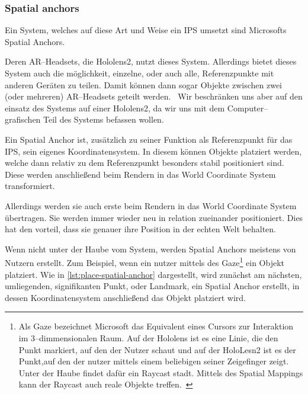     \subsubsection{Spatial anchors}\label{subsubsec:spatial-anchors}
        Ein System, welches auf diese Art und Weise ein IPS umsetzt sind Microsofts Spatial Anchors.~\autocite{thetuvix-2023B}

        Deren AR--Headsets, die Hololens2, nutzt dieses System.
        Allerdings bietet dieses System auch die möglichkeit, einzelne, oder auch alle, Referenzpunkte mit anderen Geräten zu teilen.
        Damit können dann sogar Objekte zwischen zwei (oder mehreren) AR--Headsets geteilt werden.~\autocite{pamistel-2022}
        Wir beschränken uns aber auf den einsatz des Systems auf einer Hololens2, da wir uns mit dem Computer--grafischen Teil des Systems befassen wollen.

        Ein Spatial Anchor ist, zusätzlich zu seiner Funktion als Referenzpunkt für das IPS, sein eigenes Koordinatensystem.
        In diesem können Objekte platziert werden, welche dann relativ zu dem Referenzpunkt besonders stabil positioniert sind.
        Diese werden anschließend beim Rendern in das World Coordinate System transformiert.

        Allerdings werden sie auch erste beim Rendern in das World Coordinate System übertragen.
        Sie werden immer wieder neu in relation zueinander positioniert.
        Dies hat den vorteil, dass sie genauer ihre Position in der echten Welt behalten.

        Wenn nicht unter der Haube vom System, werden Spatial Anchors meistens von Nutzern erstellt.
        Zum Beispiel, wenn ein nutzer mittels des Gaze\footnote{Als Gaze bezeichnet Microsoft das Equivalent eines Cursors zur Interaktion im 3--dimmensionalen Raum. Auf der Hololens ist es eine Linie, die den Punkt markiert, auf den der Nutzer schaut und auf der HoloLesn2 ist es der Punkt,auf den der nutzer mittels einem beliebigen seiner Zeigefinger zeigt.~\autocite{sostel-2023} Unter der Haube findet dafür ein Raycast stadt. Mittels des Spatial Mappings kann der Raycast auch reale Objekte treffen.~\autocite{mattzmsft-2023}} ein Objekt platziert.
        Wie in \autoref{lst:place-spatial-anchor} dargestellt, wird zunächst am nächsten, umliegenden, signifikanten Punkt, oder Landmark, ein Spatial Anchor erstellt, in dessen Koordinatensystem anschließend das Objekt platziert wird.

        

